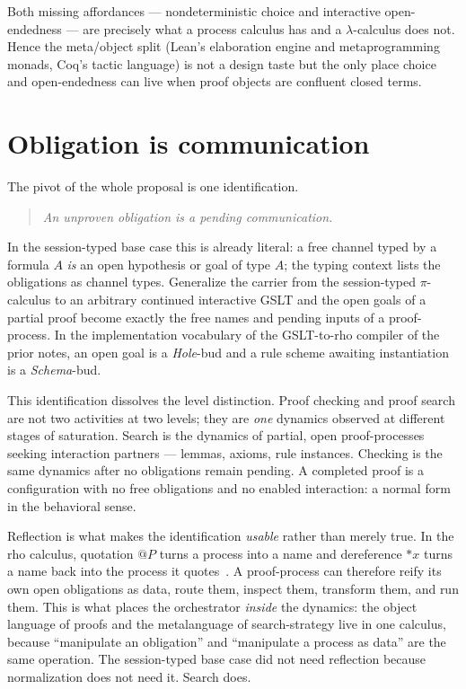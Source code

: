 \documentclass[11pt]{article}
\makeatletter
\theoremstyle{plain}
\theoremstyle{definition}
\theoremstyle{remark}
\newcommand{\quoteP}[1]{@#1}
\newcommand{\drop}[1]{{*}#1}
\makeatother
\begin{document}
Both missing affordances --- nondeterministic choice and interactive
open-endedness --- are precisely what a process calculus has and a
$\lambda$-calculus does not. Hence the meta/object split (Lean's elaboration
engine and metaprogramming monads, Coq's tactic language) is not a design taste
but the only place choice and open-endedness can live when proof objects are
confluent closed terms.

\section{Obligation is communication}

The pivot of the whole proposal is one identification.

\begin{quote}
\emph{An unproven obligation is a pending communication.}
\end{quote}

In the session-typed base case this is already literal: a free channel typed by
a formula $A$ \emph{is} an open hypothesis or goal of type $A$; the typing
context lists the obligations as channel types. Generalize the carrier from the
session-typed $\pi$-calculus to an arbitrary continued interactive GSLT and the
open goals of a partial proof become exactly the free names and pending inputs
of a proof-process. In the implementation vocabulary of the GSLT-to-rho
compiler of the prior notes, an open goal is a \emph{Hole}-bud and a rule scheme
awaiting instantiation is a \emph{Schema}-bud.

This identification dissolves the level distinction. Proof checking and proof
search are not two activities at two levels; they are \emph{one} dynamics
observed at different stages of saturation. Search is the dynamics of partial,
open proof-processes seeking interaction partners --- lemmas, axioms, rule
instances. Checking is the same dynamics after no obligations remain pending. A
completed proof is a configuration with no free obligations and no enabled
interaction: a normal form in the behavioral sense.

Reflection is what makes the identification \emph{usable} rather than merely
true. In the rho calculus, quotation $\quoteP{P}$ turns a process into a name and
dereference $\drop{x}$ turns a name back into the process it
quotes~\cite{meredithradestock}. A proof-process can therefore reify its own
open obligations as data, route them, inspect them, transform them, and run
them. This is what places the orchestrator \emph{inside} the dynamics: the
object language of proofs and the metalanguage of search-strategy live in one
calculus, because ``manipulate an obligation'' and ``manipulate a process as
data'' are the same operation. The session-typed base case did not need
reflection because normalization does not need it. Search does.
\end{document}
